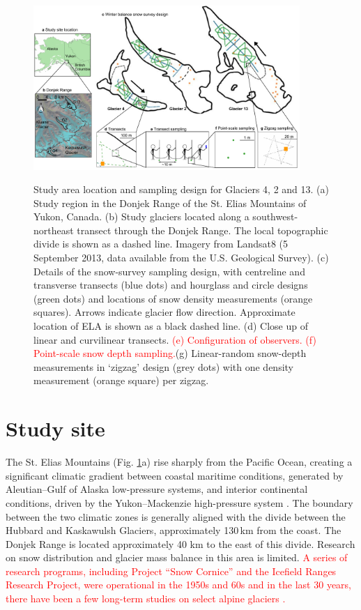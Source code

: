 \documentclass[twocolumn, letterpaper]{igs}
\begin{document}
\begin{figure}
	\centering
	\includegraphics[width =0.9\textwidth]{Sampling.pdf}\\
	\caption{Study area location and sampling design for Glaciers 4, 2 and 13. (a) Study region in the Donjek Range of the St. Elias Mountains of Yukon, Canada. (b) Study glaciers located along a southwest-northeast transect through the Donjek Range. The local topographic divide is shown as a dashed line. Imagery from Landsat8 (5 September 2013, data available from the U.S. Geological Survey). (c) Details of the snow-survey sampling design, with centreline and transverse transects (blue dots) and hourglass and circle designs (green dots) and locations of snow density measurements (orange squares). Arrows indicate glacier flow direction. Approximate location of ELA is shown as a black dashed line. (d) Close up of linear and curvilinear transects. \textcolor{red}{(e) Configuration of observers. (f) Point-scale snow depth sampling.}(g) Linear-random snow-depth measurements in `zigzag' design (grey dots) with one density measurement (orange square) per zigzag.}
	\label{fig:Sampling}
\end{figure}

\section{Study site}

The St. Elias Mountains (Fig. \ref{fig:Sampling}a) rise sharply from the Pacific Ocean, creating a significant climatic gradient between coastal maritime conditions, generated by Aleutian--Gulf of Alaska low-pressure systems, and interior continental conditions, driven by the Yukon--Mackenzie high-pressure system \citep{Taylor1969}. The boundary between the two climatic zones is generally aligned with the divide between the Hubbard and Kaskawulsh Glaciers, approximately 130\,km from the coast. The Donjek Range is located approximately 40 km to the east of this divide. Research on snow distribution and glacier mass balance in this area is limited. \textcolor{red}{A series of research programs, including Project ``Snow Cornice''  and the Icefield Ranges Research Project, were operational in the 1950s and 60s \citep{Wood1948, Danby2003} and in the last 30 years, there have been a few long-term studies on select alpine glaciers \citep{Clarke2014}.}
\end{document}
